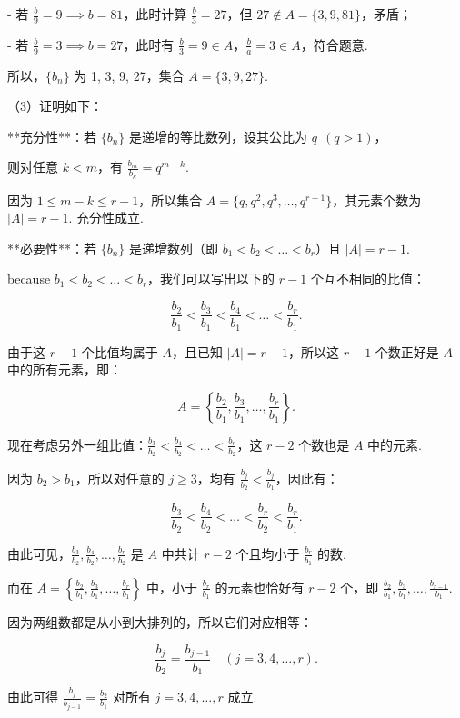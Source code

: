 \documentclass[11pt,a4paper]{ctexart}
\begin{document}
- 若 \(\frac{b}{9} = 9 \implies b = 81\)，此时计算 \(\frac{b}{3} = 27\)，但 \(27 \notin A = \{3, 9, 81\}\)，矛盾；

- 若 \(\frac{b}{9} = 3 \implies b = 27\)，此时有 \(\frac{b}{3} = 9 \in A\)，\(\frac{b}{a} = 3 \in A\)，符合题意.

所以，\(\{b_n\}\) 为 1, 3, 9, 27，集合 \(A = \{3, 9, 27\}\).

（3）证明如下：

**充分性**：若 \(\{b_n\}\) 是递增的等比数列，设其公比为 \(q\ \ (q > 1)\)，

则对任意 \(k < m\)，有 \(\frac{b_m}{b_k} = q^{m-k}\).

因为 \(1 \le m - k \le r - 1\)，所以集合 \(A = \{q, q^2, q^3, \dots, q^{r-1}\}\)，其元素个数为 \(|A| = r - 1\). 充分性成立.

**必要性**：若 \(\{b_n\}\) 是递增数列（即 \(b_1 < b_2 < \dots < b_r\)）且 \(|A| = r - 1\).

because \(b_1 < b_2 < \dots < b_r\)，我们可以写出以下的 \(r - 1\) 个互不相同的比值：

\[
\frac{b_2}{b_1} < \frac{b_3}{b_1} < \frac{b_4}{b_1} < \dots < \frac{b_r}{b_1}.
\]

由于这 \(r - 1\) 个比值均属于 $A$，且已知 \(|A| = r - 1\)，所以这 \(r - 1\) 个数正好是 $A$ 中的所有元素，即：

\[
A = \left\{\frac{b_2}{b_1}, \frac{b_3}{b_1}, \dots, \frac{b_r}{b_1}\right\}.
\]

现在考虑另外一组比值：\(\frac{b_3}{b_2} < \frac{b_4}{b_2} < \dots < \frac{b_r}{b_2}\)，这 \(r - 2\) 个数也是 $A$ 中的元素.

因为 \(b_2 > b_1\)，所以对任意的 \(j \ge 3\)，均有 \(\frac{b_j}{b_2} < \frac{b_j}{b_1}\)，因此有：

\[
\frac{b_3}{b_2} < \frac{b_4}{b_2} < \dots < \frac{b_r}{b_2} < \frac{b_r}{b_1}.
\]

由此可见，\(\frac{b_3}{b_2}, \frac{b_4}{b_2}, \dots, \frac{b_r}{b_2}\) 是 $A$ 中共计 \(r - 2\) 个且均小于 \(\frac{b_r}{b_1}\) 的数.

而在 \(A = \left\{\frac{b_2}{b_1}, \frac{b_3}{b_1}, \dots, \frac{b_r}{b_1}\right\}\) 中，小于 \(\frac{b_r}{b_1}\) 的元素也恰好有 \(r - 2\) 个，即 \(\frac{b_2}{b_1}, \frac{b_3}{b_1}, \dots, \frac{b_{r-1}}{b_1}\).

因为两组数都是从小到大排列的，所以它们对应相等：

\[
\frac{b_{j}}{b_2} = \frac{b_{j-1}}{b_1} \quad (j = 3, 4, \dots, r).
\]

由此可得 \(\frac{b_j}{b_{j-1}} = \frac{b_2}{b_1}\) 对所有 \(j = 3, 4, \dots, r\) 成立.
\end{document}
